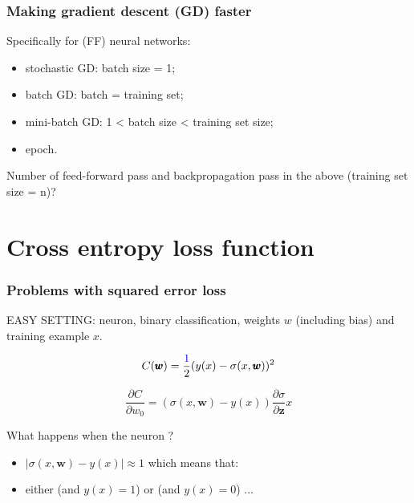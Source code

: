 \documentclass[usenames,dvipsnames]{beamer}
\begin{document}
\begin{frame}
  \frametitle{Making gradient descent (GD) faster}
  
  Specifically for (FF) neural networks:
\begin{itemize}
\item stochastic GD: batch size = 1;
  \item batch GD: batch = training set;
  \item mini-batch GD:  1 < batch size < training set size;
  \item epoch.
\end{itemize}

\vspace{1cm}

Number of feed-forward pass and backpropagation pass in the above (training set size = n)?

\end{frame}

\section{Cross entropy loss function}

 

\begin{frame}
\frametitle{Problems with squared error loss}

EASY SETTING:  neuron, binary classification,  weights $w$ (including bias) and  training example $x$.

\pause

\[ C(\pmb{w}) = \frac{\tc{blue}{1}}{2} (y(x) - \sigma(x, \pmb{w}))^2 \]

\begin{ntblock}
\[ \frac{\partial C}{\partial w_0} = (\sigma(x, \pmb{w}) - y(x)) \frac{\partial \sigma}{\partial \pmb{z}} x \]
\end{ntblock}

What happens when the neuron ?

\pause

\begin{itemize}
  \item $| \sigma(x, \pmb{w}) - y(x) | \approx 1$ which means that:
  \item either  (and $y(x)=1$) or  (and $y(x)=0$) ...
 \end{itemize}

\end{frame}
\end{document}
